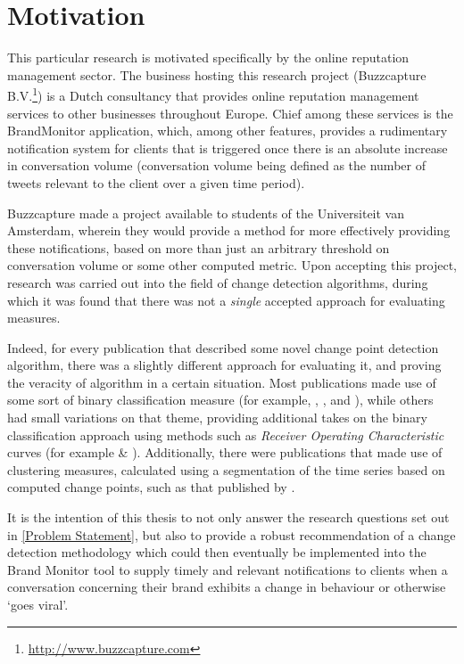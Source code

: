 \documentclass[../main.tex]{subfiles}
\begin{document}
\section{Motivation}

This particular research is motivated specifically by the online reputation management sector. The business hosting this research project (Buzzcapture B.V.\footnote{\url{http://www.buzzcapture.com}}) is a Dutch consultancy that provides online reputation management services to other businesses throughout Europe. Chief among these services is the BrandMonitor application, which, among other features, provides a rudimentary notification system for clients that is triggered once there is an absolute increase in conversation volume (conversation volume being defined as the number of tweets relevant to the client over a given time period).

Buzzcapture made a project available to students of the Universiteit van Amsterdam, wherein they would provide a method for more effectively providing these notifications, based on more than just an arbitrary threshold on conversation volume or some other computed metric. Upon accepting this project, research was carried out into the field of change detection algorithms, during which it was found that there was not a \emph{single} accepted approach for evaluating measures.

Indeed, for every publication that described some novel change point detection algorithm, there was a slightly different approach for evaluating it, and proving the veracity of algorithm in a certain situation. Most publications made use of some sort of binary classification measure (for example, \citeauthor{Qahtan2015} \cite{Qahtan2015}, \citeauthor{Buntain2014} \cite{Buntain2014}, and \citeauthor{Pelecanos2010} \cite{Pelecanos2010}), while others had small variations on that theme, providing additional takes on the binary classification approach using methods such as \emph{Receiver Operating Characteristic} curves (for example \citeauthor{Fawcett1999} \cite{Fawcett1999} \& \citeauthor{Desobry2005} \cite{Desobry2005}). Additionally, there were publications that made use of clustering measures, calculated using a segmentation of the time series based on computed change points, such as that published by \citeauthor{Matteson2012} \cite{Matteson2012}.

It is the intention of this thesis to not only answer the research questions set out in \autoref{Problem Statement}, but also to provide a robust recommendation of a change detection methodology which could then eventually be implemented into the Brand Monitor tool to supply timely and relevant notifications to clients when a conversation concerning their brand exhibits a change in behaviour or otherwise `goes viral'.
\end{document}
